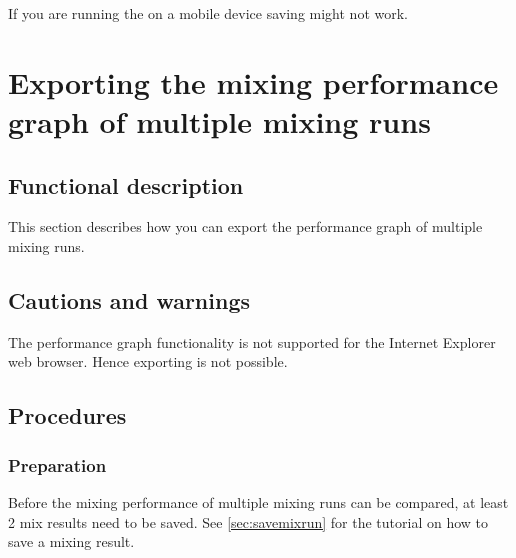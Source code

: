If you are running the \applicationname on a mobile device saving might not work.


\section{Exporting the mixing performance graph of multiple mixing runs}
\label{sec:exportMultiGraph}

\subsection{Functional description}
This section describes how you can export the performance graph of multiple mixing runs.

\subsection{Cautions and warnings}
The performance graph functionality is not supported for the Internet Explorer web browser. Hence exporting is not possible.

\subsection{Procedures}
\subsubsection{Preparation}
Before the mixing performance of multiple mixing runs can be compared, at least 2 mix results need to be saved. See \ref{sec:savemixrun} for the tutorial on how to save a mixing result.


